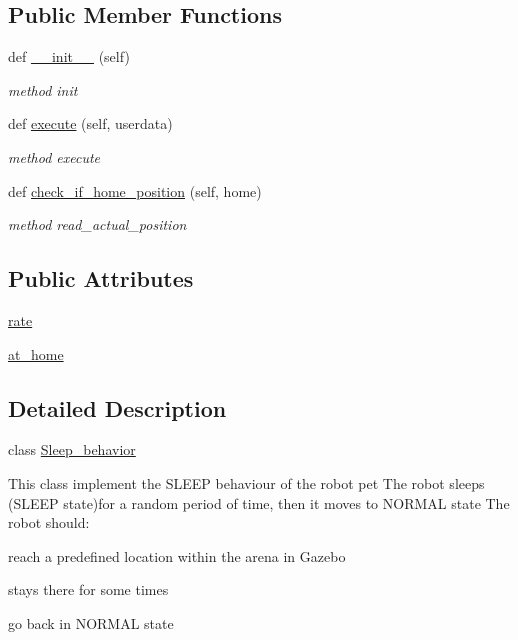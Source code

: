 \subsection*{Public Member Functions}
\begin{DoxyCompactItemize}
\item 
def \hyperlink{classbehavior__manager_1_1Sleep__behavior_a778df3c5a36999ef4792e6ac444bd7f3}{\+\_\+\+\_\+init\+\_\+\+\_\+} (self)
\begin{DoxyCompactList}\small\item\em method init \end{DoxyCompactList}\item 
def \hyperlink{classbehavior__manager_1_1Sleep__behavior_a02d87859cb76d2dbdf78d9d6e2452782}{execute} (self, userdata)
\begin{DoxyCompactList}\small\item\em method execute \end{DoxyCompactList}\item 
def \hyperlink{classbehavior__manager_1_1Sleep__behavior_a06e3c381a9966e030eb82461405d75cf}{check\+\_\+if\+\_\+home\+\_\+position} (self, home)
\begin{DoxyCompactList}\small\item\em method read\+\_\+actual\+\_\+position \end{DoxyCompactList}\end{DoxyCompactItemize}
\subsection*{Public Attributes}
\begin{DoxyCompactItemize}
\item 
\hyperlink{classbehavior__manager_1_1Sleep__behavior_a75cca73975838d3ee66cc687726685de}{rate}
\item 
\hyperlink{classbehavior__manager_1_1Sleep__behavior_ac8a99e565ddf742e5d3d25121bcc99bc}{at\+\_\+home}
\end{DoxyCompactItemize}


\subsection{Detailed Description}
class \hyperlink{classbehavior__manager_1_1Sleep__behavior}{Sleep\+\_\+behavior} 

This class implement the S\+L\+E\+EP behaviour of the robot pet The robot sleeps (S\+L\+E\+EP state)for a random period of time, then it moves to N\+O\+R\+M\+AL state The robot should\+:
\begin{DoxyItemize}
\item reach a predefined location within the arena in Gazebo
\item stays there for some times
\item go back in N\+O\+R\+M\+AL state 
\end{DoxyItemize}

